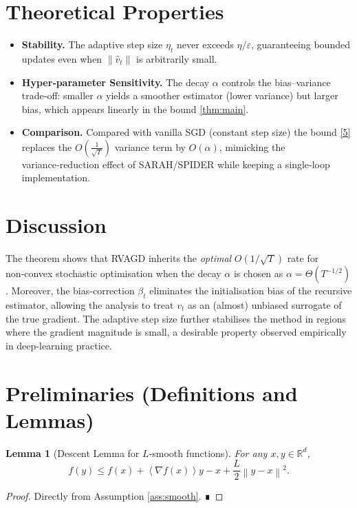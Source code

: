 \documentclass[11pt]{article}
\newtheorem{lemma}{Lemma}
\newcommand{\RR}{\mathbb{R}}
\newcommand{\norm}[1]{\left\|#1\right\|}
\newcommand{\inner}[1]{\left\langle #1 \right\rangle}
\newcommand{\grad}{\nabla}
\begin{document}
\section*{Theoretical Properties}
\begin{itemize}[leftmargin=*]
\item \textbf{Stability.} The adaptive step size $\eta_{t}$ never exceeds $\eta/\varepsilon$,
      guaranteeing bounded updates even when $\norm{\hat v_{t}}$ is arbitrarily small.
\item \textbf{Hyper‑parameter Sensitivity.}
      The decay $\alpha$ controls the bias–variance trade‑off:
      smaller $\alpha$ yields a smoother estimator (lower variance) but larger bias,
      which appears linearly in the bound \eqref{thm:main}.
\item \textbf{Comparison.}
      Compared with vanilla SGD (constant step size) the bound \eqref{5}
      replaces the $O(\frac{1}{\sqrt{T}})$ variance term by $O(\alpha)$,
      mimicking the variance‑reduction effect of SARAH/SPIDER while keeping a
      single‑loop implementation.
\end{itemize}

\section*{Discussion}
The theorem shows that RVAGD inherits the \emph{optimal} $O(1/\sqrt{T})$ rate for
non‑convex stochastic optimisation when the decay $\alpha$ is chosen as
$\alpha = \Theta(T^{-1/2})$.  Moreover, the bias‑correction $\beta_{t}$ eliminates the
initialisation bias of the recursive estimator, allowing the analysis to treat
$v_{t}$ as an (almost) unbiased surrogate of the true gradient.  The adaptive
step size further stabilises the method in regions where the gradient magnitude
is small, a desirable property observed empirically in deep‑learning practice.

\newpage
\section*{Preliminaries (Definitions and Lemmas)}
\begin{lemma}[Descent Lemma for $L$‑smooth functions]\label{lem:descent}
For any $x,y\in\RR^{d}$,
\[
f(y)\le f(x)+\inner{\grad f(x)}{y-x}+\frac{L}{2}\norm{y-x}^{2}.
\tag{L1}
\]
\end{lemma}
\begin{proof}
Directly from Assumption \ref{ass:smooth}. ∎
\end{proof}
\end{document}
